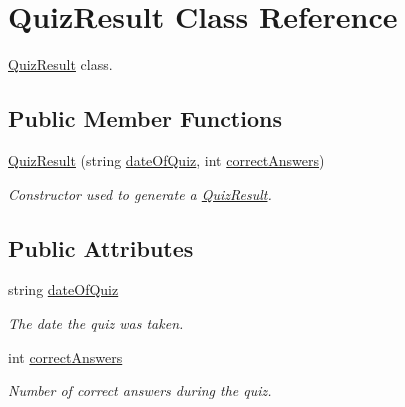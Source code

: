 \hypertarget{class_quiz_result}{}\section{Quiz\+Result Class Reference}
\label{class_quiz_result}


\hyperlink{class_quiz_result}{Quiz\+Result} class.  


\subsection*{Public Member Functions}
\begin{DoxyCompactItemize}
\item 
\hyperlink{class_quiz_result_adfc51d6f01b658543634624438bb4d1e}{Quiz\+Result} (string \hyperlink{class_quiz_result_a86aecf71051b7e6592911f0ff319d170}{date\+Of\+Quiz}, int \hyperlink{class_quiz_result_af1967ad86d0a6a544cb780a7f742c8b3}{correct\+Answers})
\begin{DoxyCompactList}\small\item\em Constructor used to generate a \hyperlink{class_quiz_result}{Quiz\+Result}. \end{DoxyCompactList}\end{DoxyCompactItemize}
\subsection*{Public Attributes}
\begin{DoxyCompactItemize}
\item 
\hypertarget{class_quiz_result_a86aecf71051b7e6592911f0ff319d170}{}string \hyperlink{class_quiz_result_a86aecf71051b7e6592911f0ff319d170}{date\+Of\+Quiz}\label{class_quiz_result_a86aecf71051b7e6592911f0ff319d170}

\begin{DoxyCompactList}\small\item\em The date the quiz was taken. \end{DoxyCompactList}\item 
\hypertarget{class_quiz_result_af1967ad86d0a6a544cb780a7f742c8b3}{}int \hyperlink{class_quiz_result_af1967ad86d0a6a544cb780a7f742c8b3}{correct\+Answers}\label{class_quiz_result_af1967ad86d0a6a544cb780a7f742c8b3}

\begin{DoxyCompactList}\small\item\em Number of correct answers during the quiz. \end{DoxyCompactList}\end{DoxyCompactItemize}


